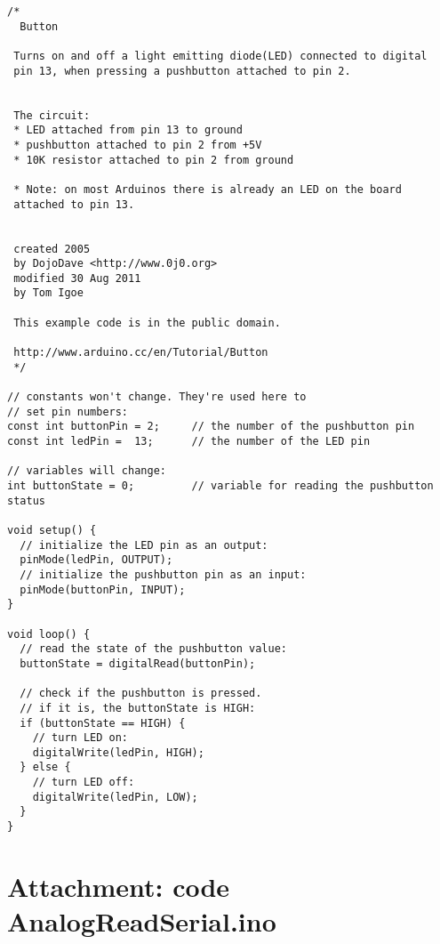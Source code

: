 \documentclass{arduino}
\begin{document}
\begin{minipage}{\widemargin}
\begin{lstlisting}
/*
  Button

 Turns on and off a light emitting diode(LED) connected to digital
 pin 13, when pressing a pushbutton attached to pin 2.


 The circuit:
 * LED attached from pin 13 to ground
 * pushbutton attached to pin 2 from +5V
 * 10K resistor attached to pin 2 from ground

 * Note: on most Arduinos there is already an LED on the board
 attached to pin 13.


 created 2005
 by DojoDave <http://www.0j0.org>
 modified 30 Aug 2011
 by Tom Igoe

 This example code is in the public domain.

 http://www.arduino.cc/en/Tutorial/Button
 */

// constants won't change. They're used here to
// set pin numbers:
const int buttonPin = 2;     // the number of the pushbutton pin
const int ledPin =  13;      // the number of the LED pin

// variables will change:
int buttonState = 0;         // variable for reading the pushbutton status

void setup() {
  // initialize the LED pin as an output:
  pinMode(ledPin, OUTPUT);
  // initialize the pushbutton pin as an input:
  pinMode(buttonPin, INPUT);
}

void loop() {
  // read the state of the pushbutton value:
  buttonState = digitalRead(buttonPin);

  // check if the pushbutton is pressed.
  // if it is, the buttonState is HIGH:
  if (buttonState == HIGH) {
    // turn LED on:
    digitalWrite(ledPin, HIGH);
  } else {
    // turn LED off:
    digitalWrite(ledPin, LOW);
  }
}
\end{lstlisting}
\end{minipage}

\newpage

\section{Attachment: code AnalogReadSerial.ino}
\end{document}
